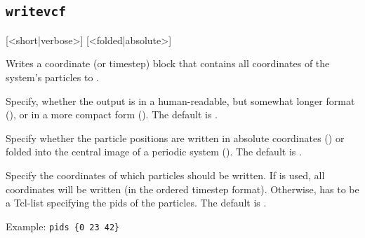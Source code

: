 \subsection{\texttt{writevcf}}
{ [<short|verbose>] [<folded|absolute>]}

Writes a coordinate (or timestep) block that contains all coordinates
of the system's particles to .

\begin{tcloptions}
   Specify, whether the output is in a
  human-readable, but somewhat longer format (), or
  in a more compact form (). The default is
  .

   Specify whether the particle positions
  are written in absolute coordinates () or folded
  into the central image of a periodic system (). The
  default is .

   Specify the coordinates of which particles
  should be written. If  is used, all coordinates will be
  written (in the ordered timestep format). Otherwise,  has
  to be a Tcl-list specifying the pids of the particles. The default
  is .
  
  Example: \verb!pids {0 23 42}!

\end{tcloptions}



